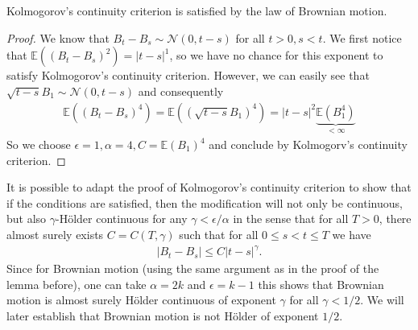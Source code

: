 \documentclass[../mainfile.tex]{subfiles}
\begin{document}
\begin{lem} Kolmogorov's continuity criterion is satisfied by the law of Brownian motion. 
\end{lem}
\begin{proof}
We know that $B_t-B_s \sim \mathcal{N}(0,t-s)$ for all $t>0, s<t$. We first notice that $\mathbb{E}((B_t-B_s)^2)=|t-s|^1$, so we have no chance for this exponent to satisfy Kolmogorov's continuity criterion. However, we can easily see that $\sqrt{t-s} B_1 \sim \mathcal{N}(0,t-s)$ and consequently
\begin{align*}
\mathbb{E}((B_t-B_s)^4)=\mathbb{E}( (\sqrt{t-s} B_1)^4)= |t-s|^2 \underbrace{\mathbb{E}(B_1^4)}_{< \infty}
\end{align*}
So we choose $\epsilon=1, \alpha=4, C= \mathbb{E}(B_1)^4$ and conclude by Kolmogorv's continuity criterion.
\end{proof}
\newpage
\begin{rem}
It is possible to adapt the proof of Kolmogorov's continuity criterion to show that if the conditions are satisfied, then the modification will not only be continuous, but also $\gamma$-Hölder continuous for any $\gamma < \epsilon/\alpha$ in the sense that for all $T>0$, there almost surely exists $C=C(T,\gamma)$ such that for all $0 \leq s < t \leq T$ we have
\begin{align*}
|B_t-B_s| \leq C|t-s|^\gamma. 
\end{align*}
Since for Brownian motion (using the same argument as in the proof of the lemma before), one can take $\alpha = 2k$ and $\epsilon = k-1$ this shows that Brownian motion is almost surely Hölder continuous of exponent $\gamma$ for all $\gamma < 1/2$. We will later establish that Brownian motion is not Hölder of exponent $1/2$. 
\end{rem}
\newpage
\end{document}
